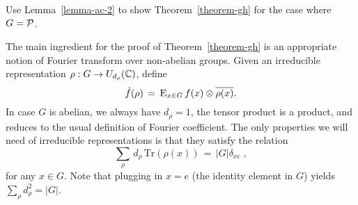 \begin{exercise}
Use Lemma~\ref{lemma-ac-2} to show Theorem~\ref{theorem-gh} for the case where $G=\mathcal{P}$. 
\end{exercise}

The main ingredient for the proof of Theorem~\ref{theorem-gh} is an appropriate notion of Fourier transform over non-abelian groups. Given an irreducible representation $\rho: G \to U_{d_\rho}(\mathbb{C})$, define 
\begin{equation}\label{equation-fourier}
 \hat{f}(\rho) \,=\, \textsc{E}_{x\in G} \,f(x) \otimes \overline{\rho(x)}.
\end{equation}
In case $G$ is abelian, we always have $d_\rho=1$, the tensor product is a product, and  reduces to the usual definition of Fourier coefficient. The only properties we will need of irreducible representations is that they satisfy the relation
\begin{equation}
\label{equation-ortho}
\sum_\rho \,d_\rho\,\mathrm{Tr}(\rho(x)) \,=\, |G|\delta_{xe}\;,
\end{equation}
for any $x\in G$. Note that plugging in $x=e$ (the identity element in $G$) yields $\sum_\rho d_\rho^2= |G|$. 

